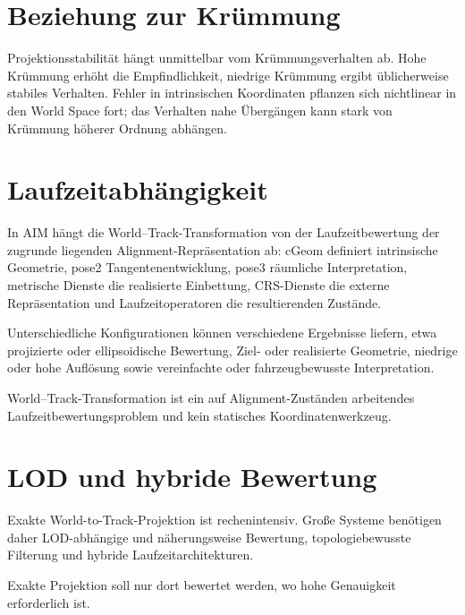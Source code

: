\section{Beziehung zur Krümmung}

Projektionsstabilität hängt unmittelbar vom Krümmungsverhalten ab. Hohe
Krümmung erhöht die Empfindlichkeit, niedrige Krümmung ergibt üblicherweise
stabiles Verhalten. Fehler in intrinsischen Koordinaten pflanzen sich
nichtlinear in den World Space fort; das Verhalten nahe Übergängen kann stark
von Krümmung höherer Ordnung abhängen.

\section{Laufzeitabhängigkeit}

In AIM hängt die World--Track-Transformation von der Laufzeitbewertung der
zugrunde liegenden Alignment-Repräsentation ab: cGeom definiert intrinsische
Geometrie, pose2 Tangentenentwicklung, pose3 räumliche Interpretation,
metrische Dienste die realisierte Einbettung, CRS-Dienste die externe
Repräsentation und Laufzeitoperatoren die resultierenden Zustände.

Unterschiedliche Konfigurationen können verschiedene Ergebnisse liefern, etwa
projizierte oder ellipsoidische Bewertung, Ziel- oder realisierte Geometrie,
niedrige oder hohe Auflösung sowie vereinfachte oder fahrzeugbewusste
Interpretation.

\begin{principle}[Laufzeitprojektionsprinzip]
\label{princ:runtime-projection}
World--Track-Transformation ist ein auf Alignment-Zuständen arbeitendes
Laufzeitbewertungsproblem und kein statisches Koordinatenwerkzeug.
\end{principle}

\section{LOD und hybride Bewertung}

Exakte World-to-Track-Projektion ist rechenintensiv. Große Systeme benötigen
daher LOD-abhängige und näherungsweise Bewertung, topologiebewusste Filterung
und hybride Laufzeitarchitekturen.

\begin{proposition}
\label{prop:selective-projection}
Exakte Projektion soll nur dort bewertet werden, wo hohe Genauigkeit
erforderlich ist.
\end{proposition}

